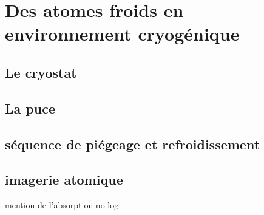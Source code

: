 \chapter{Des atomes froids en environnement cryogénique}
\label{chapter:setup_coldatoms}

\section{Le cryostat}
\section{La puce}
\section{séquence de piégeage et refroidissement}
\section{imagerie atomique}
		mention de l'absorption no-log
%		
%		
%		
%		
%
